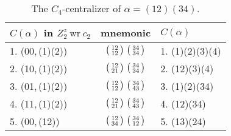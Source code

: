 \documentclass{surv-l}
\numberwithin{equation}{section}
\numberwithin{table}{section}
\numberwithin{figure}{section}
\theoremstyle{plain}
\theoremstyle{definition}
\begin{document}
\begin{table}
\caption{The $C_{4}$-centralizer of $\alpha=(12)(34)$.}\label{tab4.12.2}
{\begin{tabular}{@{}|l|c|l|@{}}
\hline
\multicolumn{1}{|l|}{$C(\alpha)$ in $Z_{2}^{z}\  \mathrm{wr} \ c_{2}$}&    \multicolumn{1}{|l|}{mnemonic}& \multicolumn{1}{|l|}{$C(\alpha)$}   \\
\hline
1. (00,\,(1)(2)) &$\big(\kern0.5pt\begin{smallmatrix}12 \\ 12\end{smallmatrix}\kern0.5pt\big)\ \big(\kern0.5pt\begin{smallmatrix}34 \\ 34\end{smallmatrix}\kern0.5pt\big)$ &1. (1)(2)(3)(4) \\[3pt]
2. (10,\,(1)(2)) &$\big(\kern0.5pt\begin{smallmatrix}12 \\ 21\end{smallmatrix}\kern0.5pt\big)\ \big(\kern0.5pt\begin{smallmatrix}34 \\ 34\end{smallmatrix}\kern0.5pt\big)$ &2. (12)(3)(4) \\[3pt]
3. (01,\,(1)(2)) &$\big(\kern0.5pt\begin{smallmatrix}12 \\ 12\end{smallmatrix}\kern0.5pt\big)\ \big(\kern0.5pt\begin{smallmatrix}34 \\ 43\end{smallmatrix}\kern0.5pt\big)$ &3. (1)(2)(34) \\[3pt]
4. (11,\,(1)(2)) &$\big(\kern0.5pt\begin{smallmatrix}12 \\ 21\end{smallmatrix}\kern0.5pt\big)\ \big(\kern0.5pt\begin{smallmatrix}34 \\ 43\end{smallmatrix}\kern0.5pt\big)$ &4. (12)(34) \\[3pt]
5. (00,\,(12)) &$\big(\kern0.5pt\begin{smallmatrix}12 \\ 34\end{smallmatrix}\kern0.5pt\big)\ \big(\kern0.5pt\begin{smallmatrix}34 \\ 12\end{smallmatrix}\kern0.5pt\big)$ &5. (13)(24) \\[3pt]

\end{tabular}}
\end{table}
\end{document}

